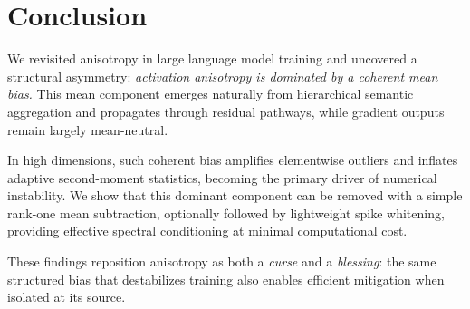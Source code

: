 \section{Conclusion}
\label{sec:conclusion}

We revisited anisotropy in large language model training and uncovered a structural asymmetry:
\emph{activation anisotropy is dominated by a coherent mean bias.}
This mean component emerges naturally from hierarchical semantic aggregation
and propagates through residual pathways,
while gradient outputs remain largely mean-neutral.

In high dimensions, such coherent bias amplifies elementwise outliers
and inflates adaptive second-moment statistics,
becoming the primary driver of numerical instability.
We show that this dominant component can be removed
with a simple rank-one mean subtraction,
optionally followed by lightweight spike whitening,
providing effective spectral conditioning at minimal computational cost.

These findings reposition anisotropy as both a \emph{curse} and a \emph{blessing}:
the same structured bias that destabilizes training
also enables efficient mitigation when isolated at its source.